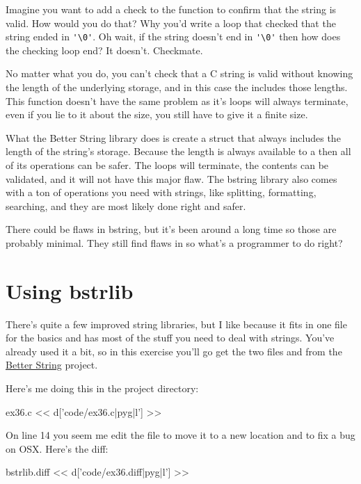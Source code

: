 Imagine you want to add a check to the  function to confirm that
the  string is valid.  How would you do that?  Why you'd write a
loop that checked that the string ended in \verb|'\0'|.  Oh wait, if the string
doesn't end in \verb|'\0'| then how does the checking loop end?  It doesn't.
Checkmate.

No matter what you do, you can't check that a C string is valid without
knowing the length of the underlying storage, and in this case the 
 includes those lengths.  This function doesn't have
the same problem as it's loops will always terminate, even if you lie
to it about the size, you still have to give it a finite size.

What the Better String library does is create a struct that always includes
the length of the string's storage.  Because the length is always available
to a  then all of its operations can be safer.  The loops
will terminate, the contents can be validated, and it will not have this
major flaw.  The bstring library also comes with a ton of operations
you need with strings, like splitting, formatting, searching, and 
they are most likely done right and safer.

There could be flaws in bstring, but it's been around a long time so
those are probably minimal.  They still find flaws in 
so what's a programmer to do right?

\section{Using bstrlib}

There's quite a few improved string libraries, but I like 
because it fits in one file for the basics and has most of the stuff you need
to deal with strings.  You've already used it a bit, so in this exercise you'll
go get the two files  and  from the
\href{http://bstring.sourceforge.net/}{Better String} project.

Here's me doing this in the  project directory:

\begin{code}{ex36.c}
<< d['code/ex36.c|pyg|l'] >>
\end{code}

On line 14 you seem me edit the  file to move it
to a new location and to fix a bug on OSX.  Here's the diff:

\begin{code}{bstrlib.diff}
<< d['code/ex36.diff|pyg|l'] >>
\end{code}

